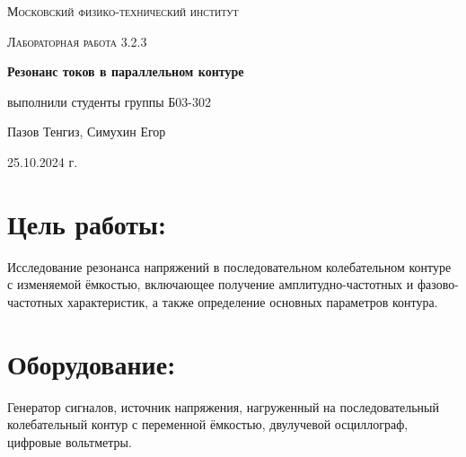 \documentclass[a4paper, 12pt]{article}
\begin{document}
\begin{titlepage}
	\centering
	{\scshape\LARGE Московский физико-технический институт \par}
	\vspace{10cm}
	{\scshape\Large Лабораторная работа 3.2.3 \par}
	\vspace{1cm}
	{\huge\bfseries Резонанс токов в параллельном контуре \par}
	\vspace{1cm}
	\vfill
\begin{flushright}
	{\large выполнили студенты группы Б03-302}\par
	\vspace{0.3cm}
	{\LARGE Пазов Тенгиз, Симухин Егор}

\end{flushright}
	\vfill
	25.10.2024 г.
\end{titlepage}
\large\section{Цель работы:}
\hspace{0.6cm}Исследование резонанса напряжений в последовательном колебательном контуре с
изменяемой ёмкостью, включающее получение амплитудно-частотных и фазово-частотных характеристик, а также определение основных параметров контура.

\section{Оборудование:}
\hspace{0.6cm}Генератор сигналов, источник напряжения, нагруженный на последовательный колебательный контур с переменной ёмкостью, двулучевой осциллограф, цифровые вольтметры.
\end{document}
